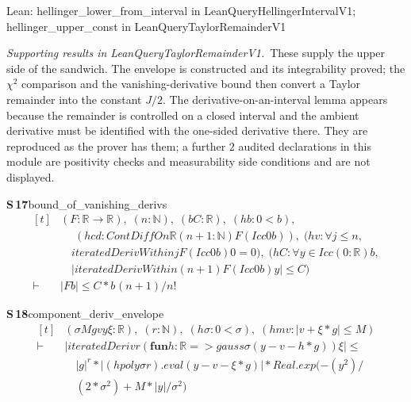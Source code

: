 \documentclass[conference]{IEEEtran}
\theoremstyle{definition}
\newcommand{\lean}[1]{\textsf{\footnotesize #1}}
\newcommand{\leanbox}[1]{%
  \par\vspace{2pt}\noindent
  {\footnotesize\textsf{Lean: #1}}\par\vspace{2pt}}
\begin{document}
\leanbox{\lean{hellinger\_lower\_from\_interval} in \lean{LeanQueryHellingerIntervalV1};
\lean{hellinger\_upper\_const} in \lean{LeanQueryTaylorRemainderV1}}

\noindent\emph{Supporting results in \lean{LeanQueryTaylorRemainderV1}.}~These supply the upper side of the sandwich. The envelope is constructed and its integrability proved; the $\chi^{2}$ comparison and the vanishing-derivative bound then convert a Taylor remainder into the constant $J/2$. The derivative-on-an-interval lemma appears because the remainder is controlled on a closed interval and the ambient derivative must be identified with the one-sided derivative there. They are reproduced as the prover has them; a further $2$ audited declarations in this module are positivity checks and measurability side conditions and are not displayed.

\noindent\textbf{S\,17}\quad\lean{bound\_of\_vanishing\_derivs}
{\footnotesize\[ \begin{aligned}[t]
&(\mathit{F} : \mathbb{R} \to \mathbb{R} ),\; (\mathit{n} : \mathbb{N} ),\; (\mathit{b} \mathit{C} : \mathbb{R} ),\; (\mathit{hb} : 0 < \mathit{b}),\\
&\quad \; (\mathit{hcd} : \mathit{ContDiffOn} \mathbb{R} (\mathit{n} + 1 : \mathbb{N} ) \mathit{F} (\mathit{Icc} 0 \mathit{b})),\; (\mathit{hv} : \forall \mathit{j} \leq \mathit{n},\\
&\quad \mathit{iteratedDerivWithin} \mathit{j} \mathit{F} (\mathit{Icc} 0 \mathit{b}) 0 = 0),\; (\mathit{hC} : \forall \mathit{y} \in \mathit{Icc} (0:\mathbb{R} ) \mathit{b},\\
&\quad |\mathit{iteratedDerivWithin} (\mathit{n} + 1) \mathit{F} (\mathit{Icc} 0 \mathit{b}) \mathit{y}| \leq \mathit{C})\\
\vdash\;&|\mathit{F} \mathit{b}| \leq \mathit{C} * \mathit{b} ^{} (\mathit{n} + 1) / \mathit{n} !
\end{aligned} \]}

\noindent\textbf{S\,18}\quad\lean{component\_deriv\_envelope}
{\footnotesize\[ \begin{aligned}[t]
&(\sigma \mathit{M} \mathit{g} \mathit{v} \mathit{y} \xi : \mathbb{R} ),\; (\mathit{r} : \mathbb{N} ),\; (\mathit{hσ} : 0 < \sigma ),\; (\mathit{hmv} : |\mathit{v} + \xi * \mathit{g}| \leq \mathit{M})\\
\vdash\;&|\mathit{iteratedDeriv} \mathit{r} (\mathbf{fun} \mathit{h} : \mathbb{R} => \mathit{gauss} \sigma (\mathit{y} - \mathit{v} - \mathit{h} * \mathit{g})) \xi | \leq\\
&\quad |\mathit{g}| ^{\mathit{r}} * |(\mathit{hpoly} \sigma \mathit{r}).\mathit{eval} (\mathit{y} - \mathit{v} - \xi * \mathit{g})| * \mathit{Real}.\mathit{exp} (-(\mathit{y} ^{2}) /\\
&\quad (2 * \sigma ^{2}) + \mathit{M} * |\mathit{y}| / \sigma ^{2})
\end{aligned} \]}
\end{document}
